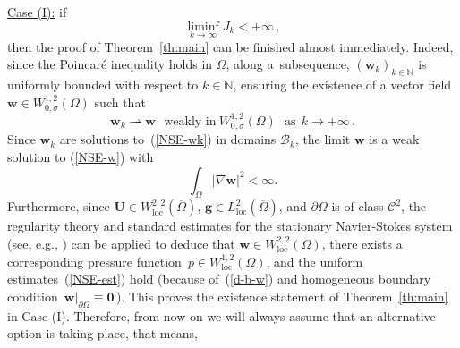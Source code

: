 \documentclass[11pt]{article}
\numberwithin{equation}{section}
\numberwithin{figure}{section}
\def\loc{{\mathrm{loc}}}
\def\0{{\mathbf 0}}
\def\we{{\mathbf w}}
\begin{document}
\underline{Case (I):} if
\begin{equation}  \label{suppose1}
\liminf\limits_{k\to \infty} J_k < +\infty \, ,
\end{equation}
then the proof of Theorem~\ref{th:main} can be finished almost immediately. Indeed, since the Poincaré inequality holds in $\Omega$, along a~subsequence, $(\mathbf{w}_{k})_{k \in \mathbb{N}}$ is uniformly bounded with respect to $k \in \mathbb{N}$, ensuring the
existence of a vector field $\mathbf{w} \in W_{0,\sigma}^{1,2}(\Omega)$ such that
\begin{equation} \label{wksconv}
	\mathbf{w}_{k} \rightharpoonup \mathbf{w} \ \ \ \text{weakly in} \ W_{0,\sigma}^{1,2}(\Omega)  \ \ \ \text{as} \ \ k \to +\infty \, .
\end{equation}
Since $\we_k$ are solutions to~(\ref{NSE-wk}) in domains $\mathcal{B}_k$, 
the limit $\we$ is a weak solution to (\ref{NSE-w}) with 
\begin{equation} \label{d-b-w}
	\int_\Omega|\nabla\we|^2<\infty.
\end{equation}
Furthermore, since $\mathbf{U} \in W^{2,2}_{\loc}(\overline\Omega)$, $\mathbf{g} \in L_\loc^2(\overline\Omega)$, and $\partial \Omega$ is
of class $\mathcal{C}^{2}$, the regularity theory and standard estimates for the stationary Navier-Stokes system (see, e.g., \cite[Section 3.2.4]{korobkov2024steady})  can
be applied to deduce that $\mathbf{w}\in W_{\text{loc}}^{2,2}(\Omega)$, there exists a corresponding pressure function~$p\in W_\loc^{1,2}(\Omega)$, and the uniform estimates~(\ref{NSE-est}) hold (because of~(\ref{d-b-w}) and homogeneous boundary condition~$\we|_{\partial\Omega}\equiv\0$\,). 
This proves the existence statement of Theorem~\ref{th:main} in Case (I). Therefore, from now on we will always assume that an alternative option is taking place,  that means,
\newline
\end{document}
